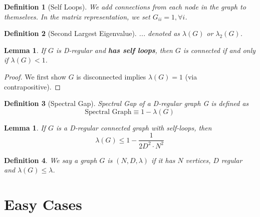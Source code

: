 \documentclass[11pt]{book}
\newtheorem{definition}{Definition}[chapter]
\newtheorem{lemma}[theorem]{Lemma}
\begin{document}
\begin{definition}[Self Loops]
	We add connections from each node in the graph to themselves. In the matrix representation, we set $G_{ii} = 1, \forall i$. 
\end{definition}

\begin{definition}[Second Largest Eigenvalue]
	... denoted as $\lambda(G)$ or $\lambda_2(G)$. 
\end{definition}

\begin{lemma}
	If $G$ is D-regular and \textbf{has self loops}, then $G$ is connected if and only if $\lambda(G) < 1$.
\end{lemma}

\begin{proof} We first show $G$ is disconnected implies $\lambda(G) = 1$ (via contrapositive). 
\end{proof}

\begin{definition}[Spectral Gap]
	Spectral Gap of a D-regular graph G is defined as 
	\begin{equation}
		\text{Spectral Graph} 
		\equiv 1 - \lambda(G)
	\end{equation}
\end{definition}

\begin{lemma}
	If $G$ is a D-regular connected graph with self-loops, then
	\begin{equation}
		\lambda (G) \leq 1 - \frac{1}{2D^2 \cdot N^2}
	\end{equation}
\end{lemma}

\begin{definition}
	We say a graph $G$ is $(N, D, \lambda)$ if it has $N$ vertices, $D$ regular and $\lambda(G) \leq \lambda$. 
\end{definition}


\section{Easy Cases}
\end{document}
